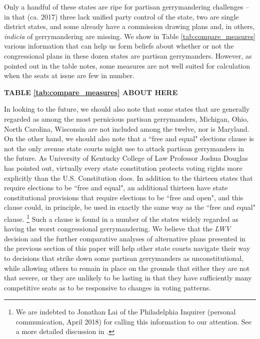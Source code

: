 Only a handful of these states are ripe for partisan gerrymandering challenges -- in that (ca. 2017) three lack unified party control of the state, two are single district states, and some already have a commission drawing plans and, in others, \textit{indicia} of gerrymandering are missing. We show in Table \ref{tab:compare_measures} various information that can help us form beliefs about whether or not the congressional plans in these dozen states are partisan gerrymanders. However, as pointed out in the table notes, some measures are not well suited for calculation when the seats at issue are few in number.
%
%
    \begin{center}\textbf{TABLE \ref{tab:compare_measures} ABOUT HERE}\end{center}
                    
%
%
In looking to the future, we should also note that some states that are generally regarded as among the most pernicious partisan gerrymanders, Michigan, Ohio,  North Carolina, Wisconsin are not included among the twelve, nor is Maryland.  On the other hand, we should also note that a ``free and equal" elections clause is not the only avenue state courts might use to attack partisan gerrymanders in the future. As University of Kentucky College of Law Professor Joshua Douglas has pointed out, virtually every state constitution protects voting rights more explicitly than the U.S. Constitution does. In addition to the thirteen states that require elections to be ``free and equal", an additional thirteen have state constitutional provisions that require elections to be ``free and open", and this clause could, in principle, be used in exactly the same way as the ``free and equal" clause.
        \footnote{We are indebted to Jonathan Lai of the Philadelphia Inquirer (personal communication, April 2018) for calling this information to our attention. See a more detailed discussion in \citet{Elmendorf2018}.}
Such a clause is found in a number of the states widely regarded as having the worst congressional gerrymandering.  We believe that the \textit{LWV} decision and the further comparative analyses of alternative plans presented in the previous section of this paper will help other state courts navigate their way to decisions that strike down some partisan gerrymanders as unconstitutional, while allowing others to remain in place on the grounds that either they are not that severe, or they are unlikely to be lasting in that they have sufficiently many competitive seats as to be responsive to changes in voting patterns.




